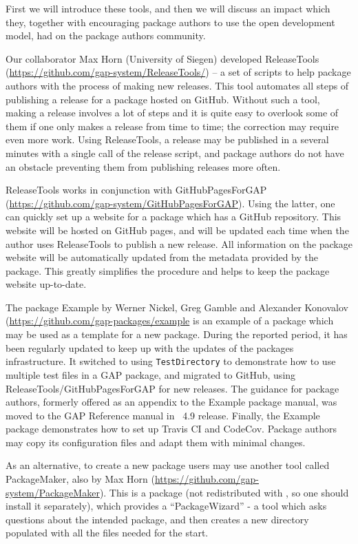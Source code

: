 \documentclass{deliverablereport}
\begin{document}
First we will introduce these tools, and then we will discuss an impact which
they, together with encouraging package authors to use the open development
model, had on the package authors community.

Our collaborator Max Horn (University of Siegen) developed {\sf ReleaseTools}
(\url{https://github.com/gap-system/ReleaseTools/})
-- a set of scripts to help package authors with the process of making new 
releases. This tool automates all steps of publishing a release for a \GAP package
hosted on GitHub. Without such a tool, making a release involves a lot of steps
and it is quite easy to overlook some of them if one only makes a release from 
time to time; the correction may require even more work. Using {\sf ReleaseTools},
a release may be published in a several minutes with a single call of the release
script, and package authors do not have an obstacle preventing them from publishing
releases more often.

{\sf ReleaseTools} works in conjunction with {\sf GitHubPagesForGAP}
(\url{https://github.com/gap-system/GitHubPagesForGAP}). Using the
latter, one can quickly set up a website for a \GAP package which has
a GitHub repository. This website will be hosted on GitHub pages,
and will be updated each time when the author uses {\sf ReleaseTools}
to publish a new release. All information on the package
website will be automatically updated from the metadata provided by
the package. This greatly simplifies the procedure and helps to keep 
the package website up-to-date.

The \GAP package {\sf Example} by Werner Nickel, Greg Gamble and
Alexander Konovalov (\url{https://github.com/gap-packages/example}
is an example of a \GAP package which may be used as a template for 
a new package. During the reported period, it has been regularly updated
to keep up with the updates of the packages infrastructure. It
switched to using {\tt TestDirectory} to demonstrate how to use 
multiple test files in a GAP package, and migrated
to GitHub, using {\sf ReleaseTools/GitHubPagesForGAP}
for new releases. The guidance for package authors, formerly offered
as an appendix to the {\sf Example} package manual, was moved to the GAP
Reference manual in \GAP~4.9 release. Finally, the {\sf Example} package
demonstrates how to set up Travis CI and CodeCov. Package authors
may copy its configuration files and adapt them with minimal changes.

As an alternative, to create a new package
\GAP users may use another tool called {\sf PackageMaker},
also by Max Horn (\url{https://github.com/gap-system/PackageMaker}). This is
a \GAP package (not redistributed with \GAP, so one should install it
separately), which provides a ``PackageWizard'' - a tool which asks questions
about the intended package, and then creates a new directory populated with 
all the files needed for the start.
\end{document}

